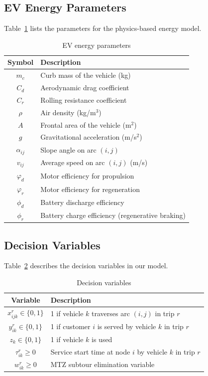 \documentclass[11pt,a4paper]{article}
\begin{document}
\subsection{EV Energy Parameters}

Table~\ref{tab:energy_params} lists the parameters for the physics-based energy model.

\begin{table}[H]
\centering
\caption{EV energy parameters}
\label{tab:energy_params}
\begin{tabular}{@{}cl@{}}
\toprule
\textbf{Symbol} & \textbf{Description} \\
\midrule
$m_c$ & Curb mass of the vehicle (kg) \\
$C_d$ & Aerodynamic drag coefficient \\
$C_r$ & Rolling resistance coefficient \\
$\rho$ & Air density (kg/m$^3$) \\
$A$ & Frontal area of the vehicle (m$^2$) \\
$g$ & Gravitational acceleration (m/s$^2$) \\
$\alpha_{ij}$ & Slope angle on arc $(i, j)$ \\
$v_{ij}$ & Average speed on arc $(i, j)$ (m/s) \\
$\varphi_d$ & Motor efficiency for propulsion \\
$\varphi_r$ & Motor efficiency for regeneration \\
$\phi_d$ & Battery discharge efficiency \\
$\phi_r$ & Battery charge efficiency (regenerative braking) \\
\bottomrule
\end{tabular}
\end{table}

\subsection{Decision Variables}

Table~\ref{tab:variables} describes the decision variables in our model.

\begin{table}[H]
\centering
\caption{Decision variables}
\label{tab:variables}
\begin{tabular}{@{}cl@{}}
\toprule
\textbf{Variable} & \textbf{Description} \\
\midrule
$x_{ijk}^r \in \{0,1\}$ & 1 if vehicle $k$ traverses arc $(i,j)$ in trip $r$ \\
$y_{ik}^r \in \{0,1\}$ & 1 if customer $i$ is served by vehicle $k$ in trip $r$ \\
$z_k \in \{0,1\}$ & 1 if vehicle $k$ is used \\
$\tau_{ik}^r \geq 0$ & Service start time at node $i$ by vehicle $k$ in trip $r$ \\
$w_{ik}^r \geq 0$ & MTZ subtour elimination variable \\
\bottomrule
\end{tabular}
\end{table}
\end{document}
